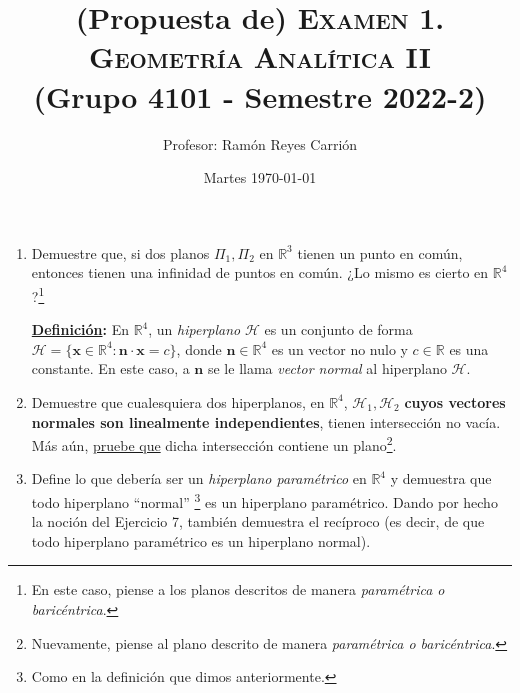 \documentclass[a4paper, 12pt]{article}
\title{\vspace{-5ex}
(Propuesta de) \textbf{\scshape{\color{purple}  Examen 1. \\ Geometría Analítica II}}\\
(Grupo 4101 - Semestre 2022-2) \\
%
\vspace{-1.5ex}}
\author{Profesor: Ramón Reyes Carrión}
\date{Martes \today} %
\begin{document}
\maketitle %
%
%
\begin{enumerate}
\item Demuestre que, si dos planos $\Pi_{1},\Pi_{2}$ en $\mathbb{R}^3$ tienen un punto en común, entonces tienen una infinidad de puntos en común. ¿Lo mismo es cierto en $\mathbb{R}^4$?\footnote{En este caso, piense a los planos descritos de manera \emph{paramétrica o baricéntrica}.}

\textbf{\color{blue}\underline{Definición}:} En $\mathbb{R}^4$, un \emph{hiperplano} $\mathcal{H}$ es un conjunto de forma $\mathcal{H} = \{\mathbf{x} \in \mathbb{R}^4 : \mathbf{n} \cdot \mathbf{x} = c\}$, donde $\mathbf{n} \in \mathbb{R}^4$ es un vector no nulo y $c\in\mathbb{R}$ es una constante. En este caso, a $\mathbf{n}$ se le llama \emph{vector normal} al hiperplano $\mathcal{H}$. 

\item Demuestre que cualesquiera dos hiperplanos, en $\mathbb{R}^4$, $\mathcal{H}_{1}, \mathcal{H}_{2}$ \textbf{cuyos vectores normales son linealmente independientes}, tienen intersección no vacía. Más aún, \underline{pruebe que} dicha intersección contiene un plano\footnote{Nuevamente, piense al plano descrito de manera \emph{paramétrica o baricéntrica}.}. 

\item Define lo que debería ser un \emph{hiperplano paramétrico} en $\mathbb{R}^4$ y demuestra que todo hiperplano \textquotedblleft{normal}\textquotedblright%
\footnote{Como en la definición que dimos anteriormente.} 
%
es un hiperplano paramétrico. Dando por hecho la noción del Ejercicio 7, también demuestra el recíproco (es decir, de que todo hiperplano paramétrico es un hiperplano normal). 


\end{enumerate}
\end{document}
